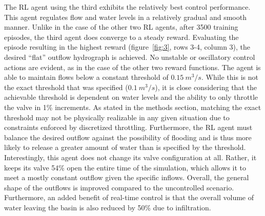 The RL agent using the third   exhibits the relatively best control performance.
This agent regulates flow and water levels in a relatively gradual and smooth manner.
Unlike in the case of the other two RL agents, after 3500 training episodes, the third agent does converge to a steady reward.
Evaluating the episode resulting in the highest reward (figure~\ref{fig:3}, rows 3-4, column 3), the desired “flat” outflow hydrograph is achieved.
No unstable or oscillatory control actions are evident, as in the case of the other two reward functions.
The agent is able to maintain flows below a constant threshold of $0.15\ m^3/s$.
While this is not the exact threshold that was specified ($0.1\ m^3/s$), it is close considering that the achievable threshold is dependent on water levels and the ability to only throttle the valve in 1\% increments.
As stated in the methods section, matching the exact threshold may not be physically realizable in any given situation due to constraints enforced by discretized throttling.
Furthermore, the RL agent must balance the desired outflow against the possibility of flooding and is thus more likely to release a greater amount of water than is specified by the threshold. Interestingly, this agent does not change its valve configuration at all.
Rather, it keeps its valve 54\% open the entire time of the simulation, which allows it to meet a mostly constant outflow given the specific inflows. Overall, the general shape of the outflows is improved compared to the uncontrolled scenario.
Furthermore, an added benefit of real-time control is that the overall volume of water leaving the basin is also reduced by 50\% due to infiltration.


